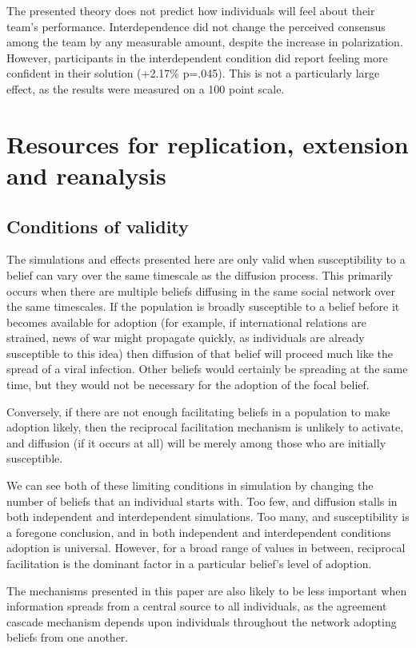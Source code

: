 \documentclass{article}
\begin{document}
The presented theory does not predict how individuals will feel about their team’s performance. Interdependence did not change the perceived consensus among the team by any measurable amount, despite the increase in polarization. However, participants in the interdependent condition did report feeling more confident in their solution (+2.17\% p=.045). This is not a particularly large effect, as the results were measured on a 100 point scale.




\section{Resources for replication, extension and reanalysis}

\subsection{Conditions of validity}
The simulations and effects presented here are only valid when susceptibility to a belief can vary over the same timescale as the diffusion process. This primarily occurs when there are multiple beliefs diffusing in the same social network over the same timescales. If the population is broadly susceptible to a belief before it becomes available for adoption (for example, if international relations are strained, news of war might propagate quickly, as individuals are already susceptible to this idea) then diffusion of that belief will proceed much like the spread of a viral infection. Other beliefs would certainly be spreading at the same time, but they would not be necessary for the adoption of the focal belief. 

Conversely, if there are not enough facilitating beliefs in a population to make adoption likely, then the reciprocal facilitation mechanism is unlikely to activate, and diffusion (if it occurs at all) will be merely among those who are initially susceptible.

We can see both of these limiting conditions in simulation by changing the number of beliefs that an individual starts with. Too few, and diffusion stalls in both independent and interdependent simulations. Too many, and susceptibility is a foregone conclusion, and in both independent and interdependent conditions adoption is universal. However, for a broad range of values in between, reciprocal facilitation is the dominant factor in a particular belief's level of adoption.

The mechanisms presented in this paper are also likely to be less important when information spreads from a central source to all individuals, as the agreement cascade mechanism depends upon individuals throughout the network adopting beliefs from one another.
\end{document}
